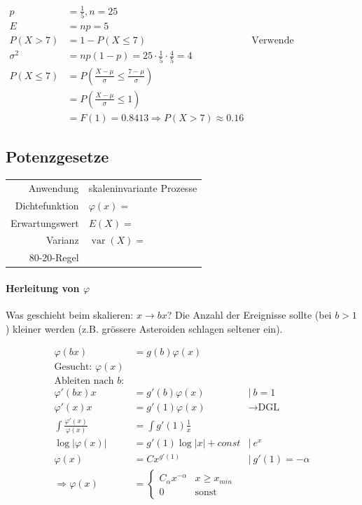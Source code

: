 \documentclass[10pt,a4paper]{scrartcl}
\newif\ifincludeDerivations
\DeclareMathOperator{\var}{var}
\begin{document}
\begin{align*}
    p &= \frac{1}{5}, n = 25 \\
    E &= np = 5 \\
    P(X>7) &= 1-P(X\le7) & \text{Verwende Normalverteilung}\\
    \sigma^2 &= np(1-p) = 25\cdot\frac{1}{5}\cdot\frac{4}{5} = 4 \\
    P(X\le7) &= P\left(\frac{X-\mu}{\sigma}\le \frac{7-\mu}{\sigma}\right) \\
             &= P\left(\frac{X-\mu}{\sigma}\le 1\right) \\
             &= F(1) = 0.8413 \Rightarrow P(X>7) \approx 0.16
\end{align*}
\fi

\subsection{Potenzgesetze}
\begin{tabular}{r p{\katalogSpaltezwei}}
Anwendung & skaleninvariante Prozesse \\
Dichtefunktion & $\varphi(x) = $ \\
Erwartungswert & $ E(X) = $ \\
Varianz & $\var(X) = $ \\
80-20-Regel & \\
\end{tabular}

\ifincludeDerivations
\paragraph{Herleitung von $\varphi$}

Was geschieht beim skalieren: $x\longrightarrow bx$? Die Anzahl der Ereignisse sollte (bei $b>1$) kleiner werden (z.B. grössere Asteroiden schlagen seltener ein).

\begin{align*}
    \varphi(bx) &= g(b) \varphi(x) \\
     \text{Gesucht: } \varphi(x) \\
     \text{Ableiten nach }b: \\
     \varphi'(bx) x &= g'(b)\varphi(x) & |\  b = 1\\
     \varphi'(x)x &= g'(1) \varphi(x) & \rightarrow \text{DGL} \\
     \int \frac{\varphi'(x)}{\varphi(x)} &= \int g'(1)\frac{1}{x} \\
     \log |\varphi(x)| &= g'(1) \log |x| + const & |\ e^x \\
     \varphi(x) &= C x^{g'(1)} & |\ g'(1) = -\alpha\\
     \Longrightarrow \varphi(x)& = \begin{cases} C_\alpha x^{-\alpha} & x\ge x_{min} \\ 0 & \text{sonst} \end{cases}
\end{align*}
\end{document}
